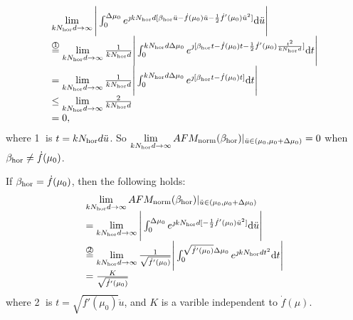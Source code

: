 \documentclass[12pt,draftclsnofoot,onecolumn]{IEEEtran}
\begin{document}
		\begin{equation}\label{notequal}
			\begin{array}{l}
				\mathop {\lim }\limits_{kN_{\rm hor}d \to \infty } \Bigg|\int_{{0}}^{ \Delta \mu_0 } {{e^{{\jmath}kN_{\rm hor}d[{\beta _{\rm hor}}\ddot{u} - \dot{f}({\mu _0})\ddot{u}-\frac{1}{2}\dot{f}'(\mu_0)\ddot{u}^2 ]}}} {\rm d}{\ddot{u}} \Bigg|\\
				\overset{\text{\textcircled{1}}}{=} \mathop {\lim }\limits_{kN_{\rm hor}d \to \infty } \frac{1}{kN_{\rm hor}d} \Bigg|\int_0^{kN_{\rm hor}d\Delta {\mu _0}} {{e^{{\jmath}[\beta_{\rm hor}t-\dot{f}(\mu_0)t-\frac{1}{2}\dot{f}'(\mu_0)\frac{t^2}{kN_{\rm hor}d}]}}} {\rm d}t\Bigg|\\
				=\mathop {\lim }\limits_{kN_{\rm hor}d \to \infty } \frac{1}{kN_{\rm hor}d} \Bigg|\int_0^{kN_{\rm hor}d\Delta {\mu _0}} {{e^{{\jmath}[\beta_{\rm hor}t-\dot{f}(\mu_0)t]}}} {\rm d}t\Bigg|\\
				\le \mathop {\lim }\limits_{kN_{\rm hor}d \to \infty } \frac{2}{kN_{\rm hor}d}\\
				=0,
			\end{array}
		\end{equation}
		where \textcircled{1} is $t=kN_{\rm hor}d\ddot{u}$.
		So $\mathop {\lim }\limits_{kN_{\rm hor}d \to \infty } AFM_{\rm norm}({\beta _{\rm hor}}){|_{\ddot{u}  \in ({\mu _0},{\mu _0} + \Delta \mu_0 )}}=0$ when $\beta_{\rm hor}\ne \dot{f}(\mu_0)$.
		
		
		If $\beta_{\rm hor} = \dot{f}(\mu_0)$, then the following holds:
		\begin{equation}\label{equal}
			\begin{array}{l}
				\mathop {\lim }\limits_{kN_{\rm hor}d \to \infty } AFM_{\rm norm}({\beta _{\rm hor}}){|_{\ddot{u}  \in ({\mu _0},{\mu _0} + \Delta \mu_0 )}}\\
				=\mathop {\lim }\limits_{kN_{\rm hor}d \to \infty }\Bigg|\int_{{0}}^{ \Delta \mu_0 } {{e^{{\jmath}kN_{\rm hor}d[-\frac{1}{2}\dot{f}'(\mu_0)\ddot{u}^2 ]}}} {\rm d}{\ddot{u}} \Bigg|\\
				\overset{\text{\textcircled{2}}}{=} \mathop {\lim }\limits_{kN_{\rm hor}d \to \infty } \frac{1}{\sqrt{\dot{f}'(\mu_0)}} \Bigg|\int_{{0}}^{ \sqrt{\dot{f}'(\mu_0)}\Delta \mu_0 } {{e^{{\jmath}kN_{\rm hor}dt^2}}} {\rm d}{t} \Bigg|\\
				=\frac{K}{\sqrt{\dot{f}'(\mu_0)}}
			\end{array}
		\end{equation}
		where \textcircled{2} is $t=\sqrt{\dot{f}'(\mu_0)}\ddot{u}$, and $K$ is a varible independent to $\dot{f}(\mu)$.
		
\end{document}
